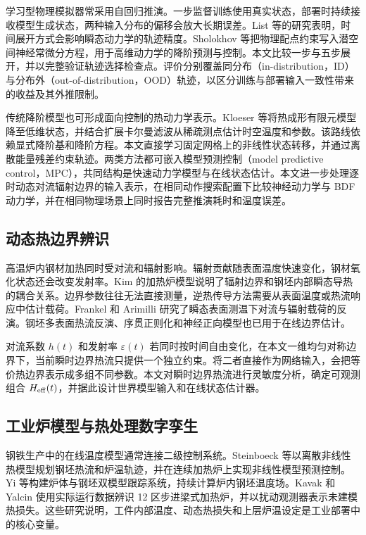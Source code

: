 学习型物理模拟器常采用自回归推演。一步监督训练使用真实状态，部署时持续接收模型生成状态，两种输入分布的偏移会放大长期误差。List 等的研究表明，时间展开方式会影响瞬态动力学的轨迹精度\cite{list2025unrolled}。Sholokhov 等把物理配点约束写入潜空间神经常微分方程，用于高维动力学的降阶预测与控制\cite{sholokhov2023pinode}。本文比较一步与五步展开，并以完整验证轨迹选择检查点。评价分别覆盖同分布（in-distribution，ID）与分布外（out-of-distribution，OOD）轨迹，以区分训练与部署输入一致性带来的收益及其外推限制。

传统降阶模型也可形成面向控制的热动力学表示。Kloeser 等将热成形有限元模型降至低维状态，并结合扩展卡尔曼滤波从稀疏测点估计时空温度和参数\cite{kloeser2021rom}。该路线依赖显式降阶基和降阶方程。本文直接学习固定网格上的非线性状态转移，并通过离散能量残差约束轨迹。两类方法都可嵌入模型预测控制（model predictive control，MPC）\cite{rawlings2017mpc}，共同结构是快速动力学模型与在线状态估计。本文进一步处理逐时动态对流辐射边界的输入表示，在相同动作搜索配置下比较神经动力学与 BDF 动力学，并在相同物理场景上同时报告完整推演耗时和温度误差。

\subsection{动态热边界辨识}

高温炉内钢材加热同时受对流和辐射影响。辐射贡献随表面温度快速变化，钢材氧化状态还会改变发射率。Kim 的加热炉模型说明了辐射边界和钢坯内部瞬态导热的耦合关系\cite{kim2007furnace}。边界参数往往无法直接测量，逆热传导方法需要从表面温度或热流响应中估计载荷。Frankel 和 Arimilli 研究了瞬态表面测温下对流与辐射载荷的反演\cite{frankel2007loads}。钢坯多表面热流反演、序贯正则化和神经正向模型也已用于在线边界估计\cite{li2015slabflux,chen2019online,mohebbi2021htc}。

对流系数 $h(t)$ 和发射率 $\varepsilon(t)$ 若同时按时间自由变化，在本文一维均匀对称边界下，当前瞬时边界热流只提供一个独立约束。将二者直接作为网络输入，会把等价热边界表示成多组不同参数。本文对瞬时边界热流进行灵敏度分析，确定可观测组合 ${H_{\mathrm{eff}}}(t)$，并据此设计世界模型输入和在线状态估计器。

\subsection{工业炉模型与热处理数字孪生}

钢铁生产中的在线温度模型通常连接二级控制系统。Steinboeck 等以离散非线性热模型规划钢坯热流和炉温轨迹，并在连续加热炉上实现非线性模型预测控制\cite{steinboeck2011trajectory,steinboeck2013nmpc}。Yi 等构建炉体与钢坯双模型跟踪系统，持续计算炉内钢坯温度场\cite{yi2017tracking}。Kavak 和 Yalcin 使用实际运行数据辨识 12 区步进梁式加热炉，并以扰动观测器表示未建模热损失\cite{kavak2023furnace}。这些研究说明，工件内部温度、动态热损失和上层炉温设定是工业部署中的核心变量。

